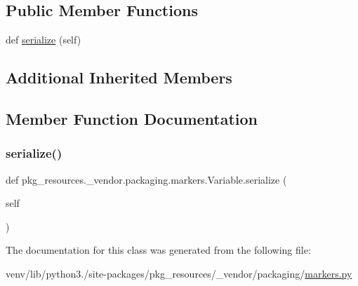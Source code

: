 \subsection*{Public Member Functions}
\begin{DoxyCompactItemize}
\item 
def \hyperlink{classpkg__resources_1_1__vendor_1_1packaging_1_1markers_1_1Variable_adf41d0e0f84f364d38fc11787426fcc6}{serialize} (self)
\end{DoxyCompactItemize}
\subsection*{Additional Inherited Members}


\subsection{Member Function Documentation}
\mbox{\label{classpkg__resources_1_1__vendor_1_1packaging_1_1markers_1_1Variable_adf41d0e0f84f364d38fc11787426fcc6}} 
\subsubsection{\texorpdfstring{serialize()}{serialize()}}
{\footnotesize\ttfamily def pkg\+\_\+resources.\+\_\+vendor.\+packaging.\+markers.\+Variable.\+serialize (\begin{DoxyParamCaption}\item[{}]{self }\end{DoxyParamCaption})}



The documentation for this class was generated from the following file\+:\begin{DoxyCompactItemize}
\item 
venv/lib/python3./site-\/packages/pkg\+\_\+resources/\+\_\+vendor/packaging/\hyperlink{pkg__resources_2__vendor_2packaging_2markers_8py}{markers.\+py}\end{DoxyCompactItemize}
